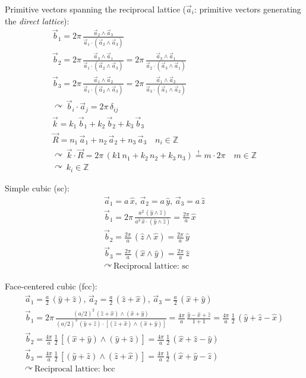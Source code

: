 \documentclass[fontsize=11pt,a4paper]{scrartcl}
\begin{document}
Primitive vectors spanning the reciprocal lattice ($\vec a_i$: primitive vectors generating the \emph{direct lattice}):
\begin{gather*}
	\vec b_1=2\pi\,\frac{\vec a_2\wedge\vec a_3}{\vec a_1\cdot(\vec a_2\wedge\vec a_3)}\\
	\vec b_2=2\pi\,\frac{\vec a_3\wedge\vec a_1}{\vec a_1\cdot(\vec a_2\wedge\vec a_3)}=2\pi\,\frac{\vec a_3\wedge\vec a_1}{\vec a_2\cdot(\vec a_3\wedge\vec a_1)}\\
	\vec b_3=2\pi\,\frac{\vec a_1\wedge\vec a_2}{\vec a_1\cdot(\vec a_2\wedge\vec a_3)}=2\pi\,\frac{\vec a_1\wedge\vec a_2}{\vec a_3\cdot(\vec a_1\wedge\vec a_2)}\\
	\curvearrowright\,\vec b_i\cdot\vec a_j=2\pi\,\delta_{ij}\\
	\vec k=k_1\,\vec b_1+k_2\,\vec b_2+k_3\,\vec b_3\\
	\vec R=n_1\,\vec a_1+n_2\,\vec a_2+n_3\,\vec a_3\quad n_i\in\mathbb{Z}\\
	\curvearrowright\,\vec k\cdot\vec R=2\pi\,(k1\,n_1+k_2\,n_2+k_3\,n_3)\stackrel{!}{=}m\cdot 2\pi\quad m\in\mathbb{Z}\\
	\curvearrowright\,k_i\in\mathbb{Z}
\end{gather*}

Simple cubic (sc):
\begin{gather*}
	\vec a_1=a\,\hat x,\,\vec a_2=a\,\hat y,\,\vec a_3=a\,\hat z\\
	\vec b_1=2\pi\,\frac{a^2\,(\hat y\wedge\hat z)}{a^3\,\hat x\cdot(\hat y\wedge\hat z)}=\frac{2\pi}{a}\,\hat x\\
	\vec b_2=\frac{2\pi}{a}\,(\hat z\wedge\hat x)=\frac{2\pi}{a}\,\hat y\\
	\vec b_3=\frac{2\pi}{a}\,(\hat x\wedge\hat y)=\frac{2\pi}{a}\,\hat z\\
	\curvearrowright\,\text{Reciprocal lattice: sc}
\end{gather*}

Face-centered cubic (fcc):
\begin{gather*}
	\vec a_1=\frac{a}{2}\,(\hat y+\hat z),\,\vec a_2=\frac{a}{2}\,(\hat z+\hat x),\,\vec a_3=\frac{a}{2}\,(\hat x+\hat y)\\
	\vec b_1=2\pi\,\frac{(a/2)^2\,(\hat z+\hat x)\wedge(\hat x+\hat y)}{(a/2)^3\,(\hat y+\hat z)\cdot\left[(\hat z+\hat x)\wedge(\hat x+\hat y)\right]}=\frac{4\pi}{a}\,\frac{\hat y-\hat x+\hat z}{1+1}=\frac{4\pi}{a}\,\frac{1}{2}\,(\hat y+\hat z-\hat x)\\
	\vec b_2=\frac{4\pi}{a}\,\frac{1}{2}\,\left[(\hat x+\hat y)\wedge(\hat y+\hat z)\right]=\frac{4\pi}{a}\,\frac{1}{2}\,(\hat x+\hat z-\hat y)\\
	\vec b_3=\frac{4\pi}{a}\,\frac{1}{2}\,\left[(\hat y+\hat z)\wedge(\hat z+\hat x)\right]=\frac{4\pi}{a}\,\frac{1}{2}\,(\hat x+\hat y-\hat z)\\
	\curvearrowright\,\text{Reciprocal lattice: bcc}
\end{gather*}
\end{document}
